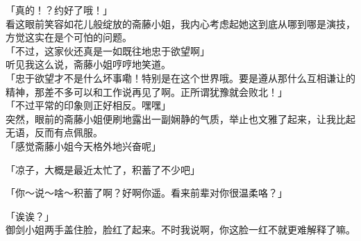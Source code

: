 「真的！？约好了哦！」\\

看这眼前笑容如花儿般绽放的斋藤小姐，我内心考虑起她这到底从哪到哪是演技，方觉这实在是个可怕的问题。\\

「不过，这家伙还真是一如既往地忠于欲望啊」\\

听见我这么说，斋藤小姐哼哼地笑道。\\

「忠于欲望才不是什么坏事嘞！特别是在这个世界哦。要是遵从那什么互相谦让的精神，那差不多可以和工作说再见了啊。正所谓犹豫就会败北！」\\

「不过平常的印象则正好相反。嘿嘿」\\

突然，眼前的斋藤小姐便刷地露出一副娴静的气质，举止也文雅了起来，让我比起无语，反而有点佩服。\\

「感觉斋藤小姐今天格外地兴奋呢」

「凉子，大概是最近太忙了，积蓄了不少吧」

「你～说～啥～积蓄了啊？好啊你遥。看来前辈对你很温柔咯？」

「诶诶？」\\

御剑小姐两手盖住脸，脸红了起来。不时我说啊，你这脸一红不就更难解释了嘛。\\

